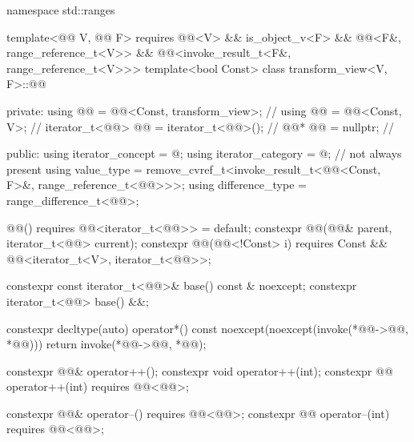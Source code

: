 %
\begin{codeblock}
namespace std::ranges {
  template<@@ V, @@ F>
    requires @@<V> && is_object_v<F> &&
             @@<F&, range_reference_t<V>> &&
             @@<invoke_result_t<F&, range_reference_t<V>>>
  template<bool Const>
  class transform_view<V, F>::@@ {
  private:
    using @@ = @@<Const, transform_view>;          // \expos
    using @@ = @@<Const, V>;                         // \expos
    iterator_t<@@> @@ = iterator_t<@@>();             // \expos
    @@* @@ = nullptr;                                  // \expos

  public:
    using iterator_concept  = @\seebelownc@;
    using iterator_category = @\seebelownc@;                        // not always present
    using value_type        =
      remove_cvref_t<invoke_result_t<@@<Const, F>&, range_reference_t<@@>>>;
    using difference_type   = range_difference_t<@@>;

    @@() requires @@<iterator_t<@@>> = default;
    constexpr @@(@@& parent, iterator_t<@@> current);
    constexpr @@(@@<!Const> i)
      requires Const && @@<iterator_t<V>, iterator_t<@@>>;

    constexpr const iterator_t<@@>& base() const & noexcept;
    constexpr iterator_t<@@> base() &&;

    constexpr decltype(auto) operator*() const
      noexcept(noexcept(invoke(*@@->@@, *@@))) {
      return invoke(*@@->@@, *@@);
    }

    constexpr @@& operator++();
    constexpr void operator++(int);
    constexpr @@ operator++(int) requires @@<@@>;

    constexpr @@& operator--() requires @@<@@>;
    constexpr @@ operator--(int) requires @@<@@>;

}}
\end{codeblock}

